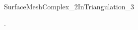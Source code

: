 \begin{ccRefConcept}{SurfaceMeshComplex_2InTriangulation_3}
\ccHasModels



\ccSeeAlso

.





\end{ccRefConcept}


